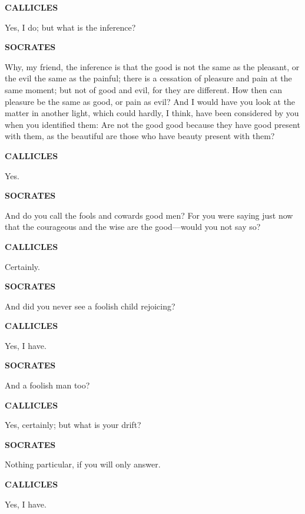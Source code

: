 \documentclass[11pt,letter]{article}
\begin{document}
\par \textbf{CALLICLES}
\par   Yes, I do; but what is the inference?

\par \textbf{SOCRATES}
\par   Why, my friend, the inference is that the good is not the same as the pleasant, or the evil the same as the painful; there is a cessation of pleasure and pain at the same moment; but not of good and evil, for they are different. How then can pleasure be the same as good, or pain as evil? And I would have you look at the matter in another light, which could hardly, I think, have been considered by you when you identified them:  Are not the good good because they have good present with them, as the beautiful are those who have beauty present with them?

\par \textbf{CALLICLES}
\par   Yes.

\par \textbf{SOCRATES}
\par   And do you call the fools and cowards good men? For you were saying just now that the courageous and the wise are the good—would you not say so?

\par \textbf{CALLICLES}
\par   Certainly.

\par \textbf{SOCRATES}
\par   And did you never see a foolish child rejoicing?

\par \textbf{CALLICLES}
\par   Yes, I have.

\par \textbf{SOCRATES}
\par   And a foolish man too?

\par \textbf{CALLICLES}
\par   Yes, certainly; but what is your drift?

\par \textbf{SOCRATES}
\par   Nothing particular, if you will only answer.

\par \textbf{CALLICLES}
\par   Yes, I have.
\end{document}
